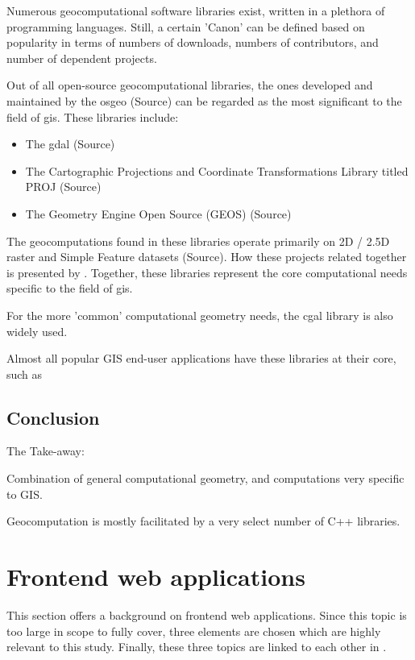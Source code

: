 Numerous geocomputational software libraries exist, written in a plethora of programming languages. 
Still, a certain 'Canon' can be defined based on popularity in terms of numbers of downloads, numbers of contributors, and number of dependent projects.  

Out of all open-source geocomputational libraries, the ones developed and maintained by the \ac{osgeo} (Source) can be regarded as the most significant to the field of \ac{gis}. 
These libraries include:
\begin{itemize}[]
  \item The \ac{gdal} (Source) 
  \item The Cartographic Projections and Coordinate Transformations Library titled PROJ (Source)
  \item The Geometry Engine Open Source (GEOS) (Source)
\end{itemize}
The geocomputations found in these libraries operate primarily on 2D / 2.5D raster and Simple Feature datasets (Source).
How these projects related together is presented by .
Together, these libraries represent the core computational needs specific to the field of \ac{gis}. 

For the more 'common' computational geometry needs, the \ac{cgal} library is also widely used.

Almost all popular GIS end-user applications have these libraries at their core, such as 

\subsection{Conclusion}
The Take-away: 

Combination of general computational geometry, and computations very specific to GIS.

Geocomputation is mostly facilitated by a very select number of C++ libraries. 

\section{Frontend web applications}
\label{sec:background-web}

This section offers a background on frontend web applications.
Since this topic is too large in scope to fully cover, three elements are chosen which are highly relevant to this study.
Finally, these three topics are linked to each other in .


